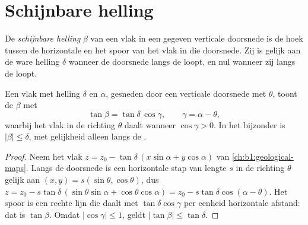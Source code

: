 \section{Schijnbare helling}\label{sec:b1:cross-sections:apparent}

\begin{definition}\label{def:b1:cross-sections:apparent-dip}
De \emph{schijnbare helling} $\beta$ van een vlak in een gegeven verticale doorsnede
is de hoek tussen de horizontale en het spoor van het vlak in die doorsnede. Zij is gelijk aan de ware helling
$\delta$ wanneer de doorsnede langs de  loopt, en nul wanneer zij langs de  loopt.
\end{definition}

\begin{theorem}\label{thm:b1:cross-sections:apparent-dip}
Een vlak met helling $\delta$ en  $\alpha$, gesneden door een verticale doorsnede met 
$\theta$, toont de  $\beta$ met
\[
  \tan\beta = \tan\delta\,\cos\gamma, \qquad \gamma = \alpha - \theta ,
\]
waarbij het vlak in de richting $\theta$ daalt wanneer $\cos\gamma > 0$.
In het bijzonder is $|\beta| \le \delta$, met gelijkheid alleen langs de .
\end{theorem}

\begin{proof}
Neem het vlak $z = z_0 - \tan\delta\,(x\sin\alpha + y\cos\alpha)$ van
\cref{ch:b1:geological-maps}. Langs de doorsnede is een horizontale stap van lengte
$s$ in de richting $\theta$ gelijk aan $(x, y) = s(\sin\theta, \cos\theta)$, dus
$z = z_0 - s\tan\delta\,(\sin\theta\sin\alpha + \cos\theta\cos\alpha) =
z_0 - s\tan\delta\cos(\alpha - \theta)$. Het spoor is een rechte lijn die daalt met
$\tan\delta\cos\gamma$ per eenheid horizontale afstand: dat is $\tan\beta$. Omdat
$|\cos\gamma| \le 1$, geldt $|\tan\beta| \le \tan\delta$.
\end{proof}

